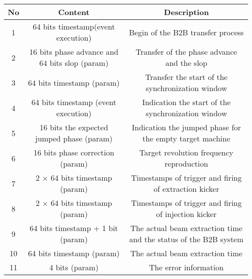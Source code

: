 \begin{landscape}
\begin{table}[!htb]
\begin{center}
\begin{tabular}{ | c | c | c | c | c | c |}
\rowcolor[gray]{0.5}
No&	\multicolumn{3}{c|}{Content}&\multicolumn{2}{c|}{Description}\\ \hline
1&	\multicolumn{3}{c|}{64 bits timestamp(event execution) } &\multicolumn{2}{c|}{Begin of the B2B transfer process}\\ \hline
2&	\multicolumn{3}{c|}{16 bits phase advance and 64 bits slop (param)}&	\multicolumn{2}{c|}{Transfer of the phase advance and the slop} \\ \hline
3&	\multicolumn{3}{c|}{64 bits timestamp (param)}	&\multicolumn{2}{c|}{Transfer the start of the synchronization window}\\ \hline
4&	\multicolumn{3}{c|}{64 bits timestamp (event execution)} &	\multicolumn{2}{c|}{Indication the start of the synchronization window}\\ \hline
5&	\multicolumn{3}{c|}{16 bits the expected jumped phase (param)} &	\multicolumn{2}{c|}{Indication the jumped phase for the empty target machine}\\ \hline
6&	\multicolumn{3}{c|}{16 bits phase correction (param)} &	\multicolumn{2}{c|}{Target revolution frequency reproduction}\\ \hline

7&	\multicolumn{3}{c|}{2 $\times$ 64 bits timestamp (param)} &\multicolumn{2}{c|}{ Timestamps of trigger and firing of extraction kicker}\\ \hline
8&	\multicolumn{3}{c|}{2 $\times$ 64 bits timestamp (param)} &	\multicolumn{2}{c|}{Timestamps of trigger and firing of injection kicker}\\ \hline

9&	\multicolumn{3}{c|}{64 bits timestamp + 1 bit (param)}&	\multicolumn{2}{c|}{The actual beam extraction time and the status of the B2B system}  \\ \hline

10& \multicolumn{3}{c|}{64 bits timestamp (param)}	&	\multicolumn{2}{c|}{The actual beam extraction time} \\ \hline
11& \multicolumn{3}{c|}{4 bits (param)}	&	\multicolumn{2}{c|}{The error information} \\ \hline

    \end{tabular}
\end{center}
\end{table}
\end{landscape} 